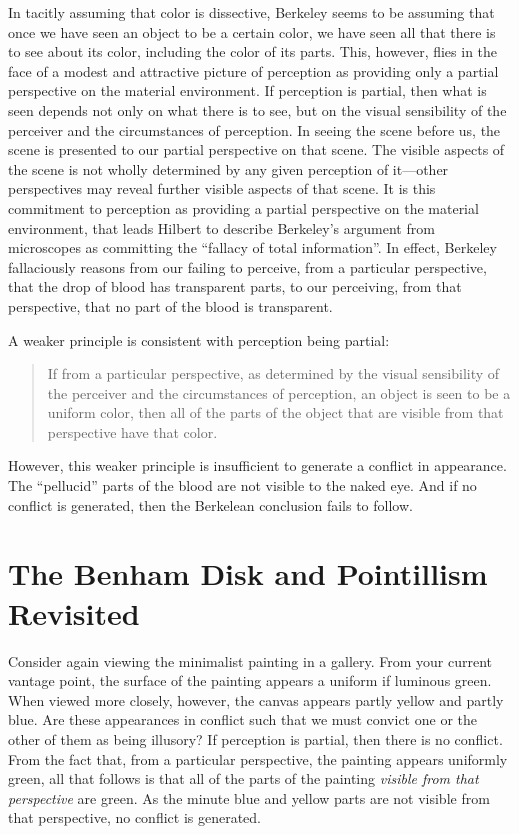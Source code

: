 \documentclass[12pt]{article}
\begin{document}
In tacitly assuming that color is dissective, Berkeley seems to be assuming that once we have seen an object to be a certain color, we have seen all that there is to see about its color, including the color of its parts. This, however, flies in the face of a modest and attractive picture of perception as providing only a partial perspective on the material environment. If perception is partial, then what is seen depends not only on what there is to see, but on the visual sensibility of the perceiver and the circumstances of perception. In seeing the scene before us, the scene is presented to our partial perspective on that scene. The visible aspects of the scene is not wholly determined by any given perception of it---other perspectives may reveal further visible aspects of that scene. It is this commitment to perception as providing a partial perspective on the material environment, that leads Hilbert to describe Berkeley's argument from microscopes as committing the ``fallacy of total information''. In effect, Berkeley fallaciously reasons from our failing to perceive, from a particular perspective, that the drop of blood has transparent parts, to our perceiving, from that perspective, that no part of the blood is transparent.

A weaker principle is consistent with perception being partial:
	\begin{quote}
		If from a particular perspective, as determined by the visual sensibility of the perceiver and the circumstances of perception, an object is seen to be a uniform color, then all of the parts of the object that are visible from that perspective have that color.
	\end{quote}
However, this weaker principle is insufficient to generate a conflict in appearance. The ``pellucid'' parts of the blood are not visible to the naked eye. And if no conflict is generated, then the Berkelean conclusion fails to follow.


\section{The Benham Disk and Pointillism Revisited}\label{sub:pointillism_revisited} %

Consider again viewing the minimalist painting in a gallery. From your current vantage point, the surface of the painting appears a uniform if luminous green. When viewed more closely, however, the canvas appears partly yellow and partly blue. Are these appearances in conflict such that we must convict one or the other of them as being illusory? If perception is partial, then there is no conflict. From the fact that, from a particular perspective, the painting appears uniformly green, all that follows is that all of the parts of the painting \emph{visible from that perspective} are green. As the minute blue and yellow parts are not visible from that perspective, no conflict is generated.
\end{document}
